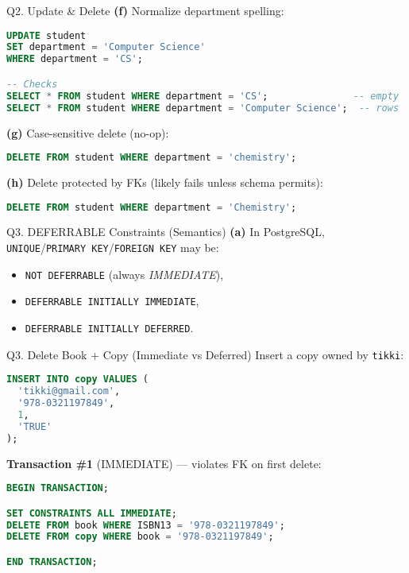 \documentclass{beamer}
\begin{document}
\begin{frame}[fragile]{Q2. Update \& Delete}
\textbf{(f)} Normalize department spelling:
\begin{lstlisting}[language=SQL]
UPDATE student
SET department = 'Computer Science'
WHERE department = 'CS';

-- Checks
SELECT * FROM student WHERE department = 'CS';               -- empty
SELECT * FROM student WHERE department = 'Computer Science';  -- rows
\end{lstlisting}

\textbf{(g)} Case-sensitive delete (no-op):
\begin{lstlisting}[language=SQL]
DELETE FROM student WHERE department = 'chemistry';
\end{lstlisting}

\textbf{(h)} Delete protected by FKs (likely fails unless schema permits):
\begin{lstlisting}[language=SQL]
DELETE FROM student WHERE department = 'Chemistry';
\end{lstlisting}
\end{frame}

\begin{frame}{Q3. DEFERRABLE Constraints (Semantics)}
\textbf{(a)} In PostgreSQL, \texttt{UNIQUE}/\texttt{PRIMARY KEY}/\texttt{FOREIGN KEY} may be:
\begin{itemize}
  \item \texttt{NOT DEFERRABLE} (always \textit{IMMEDIATE}),
  \item \texttt{DEFERRABLE INITIALLY IMMEDIATE},
  \item \texttt{DEFERRABLE INITIALLY DEFERRED}.
\end{itemize}
\end{frame}

\begin{frame}[fragile]{Q3. Delete Book + Copy (Immediate vs Deferred)}
Insert a copy owned by \texttt{tikki}:
\begin{lstlisting}[language=SQL]
INSERT INTO copy VALUES (
  'tikki@gmail.com',
  '978-0321197849',
  1,
  'TRUE'
);
\end{lstlisting}

\textbf{Transaction \#1} (IMMEDIATE) — violates FK on first delete:
\begin{lstlisting}[language=SQL]
BEGIN TRANSACTION;

SET CONSTRAINTS ALL IMMEDIATE;
DELETE FROM book WHERE ISBN13 = '978-0321197849';
DELETE FROM copy WHERE book = '978-0321197849';

END TRANSACTION;
\end{lstlisting}
\end{frame}
\end{document}
